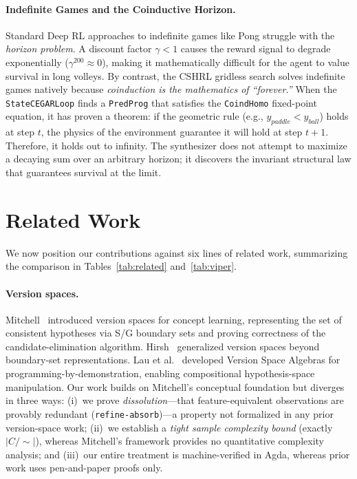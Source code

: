 \documentclass[9pt,a4paper]{article}
\theoremstyle{plain}
\theoremstyle{definition}
\theoremstyle{remark}
\begin{document}
\paragraph{Indefinite Games and the Coinductive Horizon.}
Standard Deep RL approaches to indefinite games like Pong struggle with the \emph{horizon problem}. A discount factor $\gamma < 1$ causes the reward signal to degrade exponentially ($\gamma^{200} \approx 0$), making it mathematically difficult for the agent to value survival in long volleys. By contrast, the CSHRL gridless search solves indefinite games natively because \emph{coinduction is the mathematics of ``forever.''} When the \texttt{StateCEGARLoop} finds a \texttt{PredProg} that satisfies the \texttt{CoindHomo} fixed-point equation, it has proven a theorem: if the geometric rule (e.g., $y_{paddle} < y_{ball}$) holds at step $t$, the physics of the environment guarantee it will hold at step $t+1$. Therefore, it holds out to infinity. The synthesizer does not attempt to maximize a decaying sum over an arbitrary horizon; it discovers the invariant structural law that guarantees survival at the limit.

\section{Related Work}

We now position our contributions against six lines of related work, summarizing the comparison in Tables~\ref{tab:related} and~\ref{tab:viper}.

\paragraph{Version spaces.}  Mitchell~\cite{Mitchell1982} introduced version spaces for concept learning, representing the set of consistent hypotheses via S/G boundary sets and proving correctness of the candidate-elimination algorithm.  Hirsh~\cite{Hirsh1994} generalized version spaces beyond boundary-set representations.  Lau et al.~\cite{Lau2003} developed Version Space Algebras for programming-by-demonstration, enabling compositional hypothesis-space manipulation.  Our work builds on Mitchell's conceptual foundation but diverges in three ways: (i)~we prove \emph{dissolution}---that feature-equivalent observations are provably redundant (\texttt{refine-absorb})---a property not formalized in any prior version-space work; (ii)~we establish a \emph{tight sample complexity bound} (exactly $|C/{\sim}|$), whereas Mitchell's framework provides no quantitative complexity analysis; and (iii)~our entire treatment is machine-verified in Agda, whereas prior work uses pen-and-paper proofs only.
\end{document}
